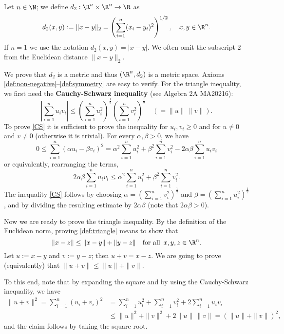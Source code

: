 \begin{example} \label{Eucl:d2}
Let $n \in \N$; we define $d_2 : \R^n \times \R^n \to \R$ as
\[
d_2(x,y):= \|x - y\|_2 = \left(\sum_{i = 1}^n (x_i - y_i)^2\right)^{1/2}, \quad x,y \in \R^n.
\]
If $n=1$ we use the notation $d_2(x,y) = |x-y|$. We often omit the subscript $2$ from the Euclidean distance $\|x-y\|_2$.

We prove that $d_2$ is a metric and thus $(\R^n,d_2)$ is a metric space. Axioms \eqref{def:non-negative}--\eqref{def:symmetry}
are easy to verify. For the triangle inequality, we first need the \textbf{Cauchy-Schwarz inequality} (see Algebra 2A MA20216):
\begin{equation}\label{CS}
 \left|\sum_{i=1}^n u_i v_i \right| \leq \left(\sum_{i=1}^n u_i^2\right)^{\frac12} \left(\sum_{i=1}^n v_i^2\right)^{\frac12} \quad (=\|u\|\, \|v\|).
\end{equation}
To prove \eqref{CS} it is sufficient to prove the inequality for $u_i, v_i\geq 0$ and for $u\neq 0$ and $v\neq 0$ (otherwise it is trivial).
For every $\alpha,\beta>0$, we have
$$
0\leq \sum_{i=1}^n (\alpha u_i - \beta v_i)^2 = \alpha^2 \sum_{i=1}^n u_i^2 + \beta^2 \sum_{i=1}^n v_i^2 - 2\alpha\beta \sum_{i=1}^n u_i v_i 
$$
or equivalently, rearranging the terms,
$$
2\alpha\beta \sum_{i=1}^n u_i v_i  \leq \alpha^2 \sum_{i=1}^n u_i^2 + \beta^2 \sum_{i=1}^n v_i^2.
$$
The inequality \eqref{CS} follows by choosing $\alpha = \left(\sum_{i=1}^n v_i^2\right)^{\frac12}$ and $\beta = \left(\sum_{i=1}^n u_i^2\right)^{\frac12}$, 
and by dividing the resulting estimate by $2\alpha\beta$ (note that $2\alpha\beta> 0$).

\medskip

Now we are ready to prove the triangle inequality. By the definition of the Euclidean norm, proving \eqref{def:triangle} means to show that 
$$
\|x-z\| \leq \|x-y\| + \|y-z\| \quad \textrm{for all } \, x,y,z\in \R^n.
$$
Let $u:=x-y$ and $v:=y-z$; then $u+v=x-z$. We are going to prove (equivalently) that $\|u+v\| \leq \|u\| + \|v\|$. 

To this end, note that by expanding the square and by using the Cauchy-Schwarz inequality, we have 
\begin{align*}
\|u+v\|^2 = \sum_{i=1}^n  (u_i + v_i)^2 &= \sum_{i=1}^n  u_i^2 + \sum_{i=1}^n  v_i^2 + 2\sum_{i=1}^n u_i v_i 
\\&\leq 
\|u\|^2 + \|v\|^2 + 2 \|u\|\, \|v\| = (\|u\|+\|v\|)^2,
\end{align*}
and the claim follows by taking the square root.
\end{example}

